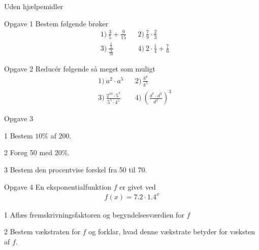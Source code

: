 \begin{center}
	\LARGE
	Uden hjælpemidler
\end{center}
\begin{opgavetekst}{Opgave 1}
	Bestem følgende brøker
	\begin{align*}
		&1) \   \frac{3}{5} + \frac{9}{15}   &&2) \  \frac{7}{9}\cdot\frac{2}{3}     \\
		&3) \  \frac{\frac{1}{2}}{\frac{4}{10}}    &&4) \  2\cdot \frac{1}{4} + \frac{7}{6}    
	\end{align*}
\end{opgavetekst}

\begin{opgavetekst}{Opgave 2}
	Reducér følgende så meget som muligt
	\begin{align*}
		&1) \   a^2\cdot a^5    &&2) \ \frac{b^9}{b^5}     \\
		&3) \   \frac{2^{10}\cdot 5^7}{5^5\cdot 4^5}    &&4) \  \left(\frac{d^7\cdot d^3}{d^2}\right)^3    
	\end{align*}
\end{opgavetekst}

\begin{opgavetekst}{Opgave 3}
\end{opgavetekst}

\begin{delopgave}{1}
	Bestem $10\%$ af 200.
\end{delopgave}
\begin{delopgave}{2}
	Forøg 50 med $20\%$.
\end{delopgave}
\begin{delopgave}{3}
	Bestem den procentvise forskel fra 50 til 70.
\end{delopgave}


\begin{opgavetekst}{Opgave 4}
	En eksponentialfunktion $f$ er givet ved
	\begin{align*}
		f(x) = 7.2\cdot 1.4^x
	\end{align*}
\end{opgavetekst}
\begin{delopgave}{1}
	Aflæs fremskrivningsfaktoren og begyndelsesværdien for $f$
\end{delopgave}
\begin{delopgave}{2}
	Bestem vækstraten for $f$ og forklar, hvad denne vækstrate betyder for væksten af $f$. 
\end{delopgave}

